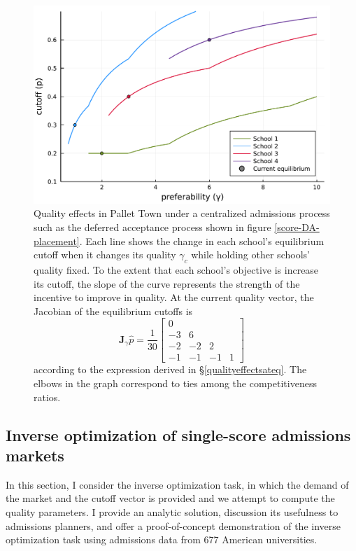 \documentclass[12pt]{article}
\theoremstyle{definition}
\begin{document}
\begin{figure}
\begin{center}\includegraphics[width=\linewidth, ]{plots/vary-gamma-cutoff.pdf}\end{center}
\captionsetup{singlelinecheck=off}
    \caption[.]{Quality effects in Pallet Town under a centralized admissions process such as the deferred acceptance process shown in figure \ref{score-DA-placement}. Each line shows the change in each school’s equilibrium cutoff when it changes its quality $\gamma_c$ while holding other schools’ quality fixed. To the extent that each school’s objective is increase its cutoff, the slope of the curve represents the strength of the incentive to improve in quality. At the current quality vector, the Jacobian of the equilibrium cutoffs is
    \begin{equation*}
    \mathbf{J}_\gamma \hat p = \frac{1}{30}
    \begin{bmatrix}
      0 & & & \\
      -3 & 6 & & \\
      -2 & -2 & 2 & \\
      -1 & -1 & -1 & 1 
    \end{bmatrix}
    \end{equation*} 
according to the expression derived in \S\ref{qualityeffectsateq}. The elbows in the graph correspond to ties among the competitiveness ratios. 
    }
\label{vary-gamma-cutoff}
\end{figure}








\subsection{Inverse optimization of single-score admissions markets}
In this section, I consider the inverse optimization task, in which the demand of the market and the cutoff vector is provided and we attempt to compute the quality parameters. I provide an analytic solution, discussion its usefulness to admissions planners, and offer a proof-of-concept demonstration of the inverse optimization task using admissions data from 677 American universities. 
\end{document}
